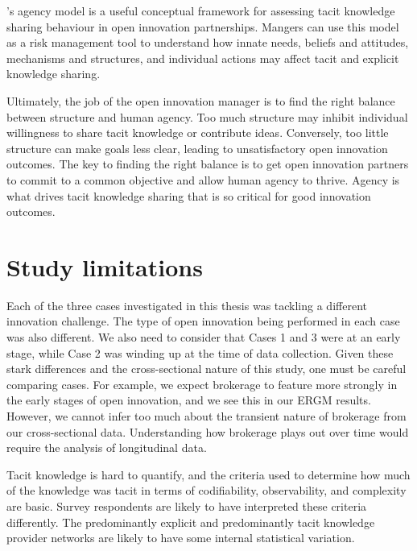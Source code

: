 \noindent
\citeauthor{loyal2001agency}'s \citeyearpar{loyal2001agency} agency model is a useful conceptual framework for assessing tacit knowledge sharing behaviour in open innovation partnerships. Mangers can use this model as a risk management tool to understand how innate needs, beliefs and attitudes, mechanisms and structures, and individual actions may affect tacit and explicit knowledge sharing.\medskip

Ultimately, the job of the open innovation manager is to find the right balance between structure and human agency. Too much structure may inhibit individual willingness to share tacit knowledge or contribute ideas. Conversely, too little structure can make goals less clear, leading to unsatisfactory open innovation outcomes. The key to finding the right balance is to get open innovation partners to commit to a common objective and allow human agency to thrive. Agency is what drives tacit knowledge sharing that is so critical for good innovation outcomes.

 \section{Study limitations}
 
 Each of the three cases investigated in this thesis was tackling a different innovation challenge. The type of open innovation being performed in each case was also different. We also need to consider that Cases 1 and 3 were at an early stage, while Case 2 was winding up at the time of data collection. Given these stark differences and the cross-sectional nature of this study, one must be careful comparing cases. For example, we expect brokerage to feature more strongly in the early stages of open innovation, and we see this in our ERGM results. However, we cannot infer too much about the transient nature of brokerage from our cross-sectional data. Understanding how brokerage plays out over time would require the analysis of longitudinal data. \medskip

Tacit knowledge is hard to quantify, and the criteria used to determine how much of the knowledge was tacit in terms of codifiability, observability, and complexity are basic. Survey respondents are likely to have interpreted these criteria differently. The predominantly explicit and predominantly tacit knowledge provider networks are likely to have some internal statistical variation. \medskip

